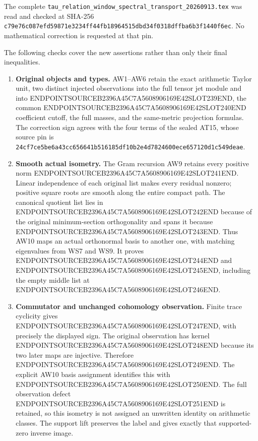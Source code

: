 The complete \texttt{tau\_relation\_window\_spectral\_transport\_20260913.tex} was read and checked at SHA-256 \texttt{c79e76c087efd59871e3234ff44fb18964515dbd34f0318dffba6b3f1440f6ec}. No mathematical correction is requested at that pin.

The following checks cover the new assertions rather than only their final inequalities.

\begin{enumerate}
\def\labelenumi{\arabic{enumi}.}
\tightlist
\item
  \textbf{Original objects and types.} AW1--AW6 retain the exact arithmetic Taylor unit, two distinct injected observations into the full tensor jet module and into ENDPOINTSOURCEB2396A45C7A5608906169E42SLOT239END, the common ENDPOINTSOURCEB2396A45C7A5608906169E42SLOT240END coefficient cutoff, the full masses, and the same-metric projection formulas. The correction sign agrees with the four terms of the sealed AT15, whose source pin is \texttt{24cf7ce5be6a43cc656641b516185df10b2e4d7824600ece657120d1c549deae}.
\item
  \textbf{Smooth actual isometry.} The Gram recursion AW9 retains every positive norm ENDPOINTSOURCEB2396A45C7A5608906169E42SLOT241END. Linear independence of each original list makes every residual nonzero; positive square roots are smooth along the entire compact path. The canonical quotient list lies in ENDPOINTSOURCEB2396A45C7A5608906169E42SLOT242END because of the original minimum-section orthogonality and spans it because ENDPOINTSOURCEB2396A45C7A5608906169E42SLOT243END. Thus AW10 maps an actual orthonormal basis to another one, with matching eigenvalues from WS7 and WS9. It proves ENDPOINTSOURCEB2396A45C7A5608906169E42SLOT244END and ENDPOINTSOURCEB2396A45C7A5608906169E42SLOT245END, including the empty middle list at ENDPOINTSOURCEB2396A45C7A5608906169E42SLOT246END.
\item
  \textbf{Commutator and unchanged cohomology observation.} Finite trace cyclicity gives ENDPOINTSOURCEB2396A45C7A5608906169E42SLOT247END, with precisely the displayed sign. The original observation has kernel ENDPOINTSOURCEB2396A45C7A5608906169E42SLOT248END because its two later maps are injective. Therefore ENDPOINTSOURCEB2396A45C7A5608906169E42SLOT249END. The explicit AW10 basis assignment identifies this with ENDPOINTSOURCEB2396A45C7A5608906169E42SLOT250END. The full observation defect ENDPOINTSOURCEB2396A45C7A5608906169E42SLOT251END is retained, so this isometry is not assigned an unwritten identity on arithmetic classes. The support lift preserves the label and gives exactly that supported-zero inverse image.

\end{enumerate}
